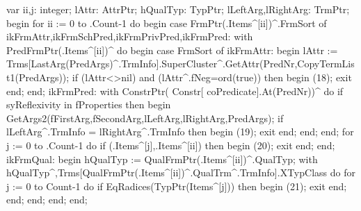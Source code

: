 var
   ii,j: integer;
   lAttr: AttrPtr;
   hQualTyp: TypPtr;
   lLeftArg,lRightArg: TrmPtr;
begin
   for ii := 0 to .Count-1 do
   begin
      case FrmPtr(.Items^[ii])^.FrmSort of
         ikFrmAttr,ikFrmSchPred,ikFrmPrivPred,ikFrmPred:
            with PredFrmPtr(.Items^[ii])^ do
         begin
            case FrmSort of
               ikFrmAttr:
                  begin
                     lAttr := Trms[LastArg(PredArgs)^.TrmInfo].SuperCluster^.GetAttr(PredNr,CopyTermList1(PredArgs));
                     if (lAttr<>nil) and (lAttr^.fNeg=ord(true)) then
                     begin
                        (18);
                        exit
                     end;
                  end;
               ikFrmPred:
                  with ConstrPtr( Constr[ coPredicate].At(PredNr))^ do
                  if syReflexivity in fProperties then
                  begin
                     GetArgs2(fFirstArg,fSecondArg,lLeftArg,lRightArg,PredArgs);
                     if lLeftArg^.TrmInfo = lRightArg^.TrmInfo then
                     begin
                        (19);
                        exit
                     end;
                  end;
            end;
            for j := 0 to .Count-1 do
               if (.Items^[j],.Items^[ii]) then
               begin
                  (20);
                  exit
               end;
         end;
         ikFrmQual:
            begin
               hQualTyp := QualFrmPtr(.Items^[ii])^.QualTyp;
               with hQualTyp^,Trms[QualFrmPtr(.Items^[ii])^.QualTrm^.TrmInfo].XTypClass do
                                 for j := 0 to Count-1 do
                                    if EqRadices(TypPtr(Items^[j])) then
                                    begin
                                       (21);
                                       exit
                                    end;
            end;
      end;
   end;
end;
\eatline
{}\nwendcode{}\nwdocspar
